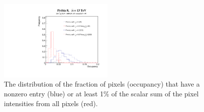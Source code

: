 \documentclass{article}
\begin{document}
\begin{figure}[htbp!]
  \begin{center}
        \includegraphics[width=0.5\textwidth]{figures/occ.pdf}
      \caption{ The distribution of the fraction of pixels (occupancy) that have a nonzero entry (blue) or at least 1\% of the scalar sum of the pixel intensities from all pixels (red).
      \label{fig:occupancy} }
    \end{center}
\end{figure}



\clearpage
\newpage

 
\end{document}

